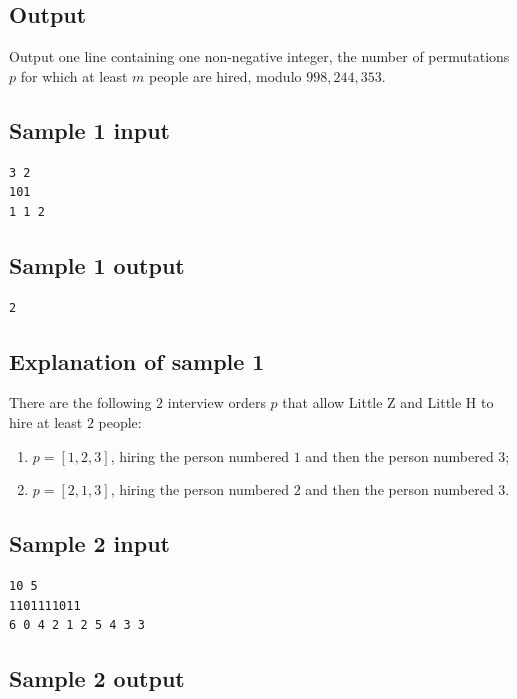 \documentclass[11pt]{article}
\begin{document}
\subsection*{Output}

Output one line containing one non-negative integer, the number of
permutations $p$ for which at least $m$ people are hired, modulo
$998{,}244{,}353$.

\subsection*{Sample 1 input}

\begin{verbatim}
3 2
101
1 1 2
\end{verbatim}

\subsection*{Sample 1 output}

\begin{verbatim}
2
\end{verbatim}

\subsection*{Explanation of sample 1}

There are the following $2$ interview orders $p$ that allow Little Z and
Little H to hire at least $2$ people:
\begin{enumerate}
\item $p = [1, 2, 3]$, hiring the person numbered $1$ and then the person
  numbered $3$;
\item $p = [2, 1, 3]$, hiring the person numbered $2$ and then the person
  numbered $3$.
\end{enumerate}

\subsection*{Sample 2 input}

\begin{verbatim}
10 5
1101111011
6 0 4 2 1 2 5 4 3 3
\end{verbatim}

\subsection*{Sample 2 output}
\end{document}
